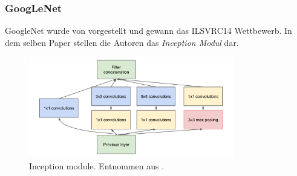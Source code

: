 \subsubsection{GoogLeNet}
\label{sec:googlenet}
GoogleNet wurde von \citet{szegedyGoingDeeperConvolutions2015} vorgestellt und gewann das ILSVRC14 Wettbewerb. In dem selben Paper stellen die Autoren das \textit{Inception Modul} dar.

 \begin{figure}[H]
	\centering
	\includegraphics[width=0.8\textwidth]{images/googlenet/inception_module.png}
	\caption{Inception module. Entnommen aus \cite{szegedyGoingDeeperConvolutions2015}.}
	\label{fig:inception_module}
\end{figure}

